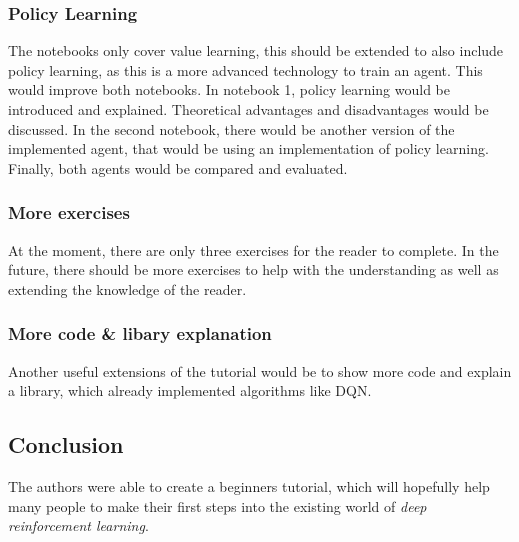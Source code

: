 \documentclass[10pt,a4paper]{article}
\begin{document}
	\subsubsection{Policy Learning}
		The notebooks only cover value learning, this should be extended to also include policy learning, as this is a more advanced technology to train an agent. 
		This would improve both notebooks. 
		In notebook 1, policy learning would be introduced and explained.
		Theoretical advantages and disadvantages would be discussed.
		In the second notebook, there would be another version of the implemented agent, that would be using an implementation of policy learning.
		Finally, both agents would be compared and evaluated.
		
	\subsubsection{More exercises}
		At the moment, there are only three exercises for the reader to complete. In the future, there should be more exercises to help with the understanding as well as extending the knowledge of the reader.
		
	\subsubsection{More code \& libary explanation}
		Another useful extensions of the tutorial would be to show more code and explain a library, which already implemented algorithms like DQN.
		
	\subsection{Conclusion}
	
	The authors were able to create a beginners tutorial, which will hopefully help many people to make their first steps into the existing world of \textit{deep reinforcement learning}.
	 
	
\end{document}
